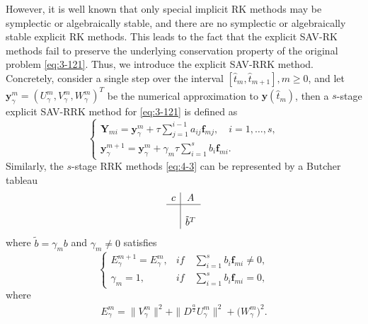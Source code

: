 \documentclass[preprint,compress,3p,10pt,fleqn]{elsarticle}
\numberwithin{equation}{section}
\begin{document}
However, it is well known that only special implicit RK methods may be symplectic or algebraically stable, and there are no symplectic or algebraically stable explicit RK methods. This leads to the fact that the explicit SAV-RK methods fail to preserve the underlying conservation property of the original problem \eqref{eq:3-121}. Thus, we introduce the explicit SAV-RRK method. Concretely, consider a single step over the interval $\left[\hat{t}_m, \hat{t}_{m+1}\right], m \geq 0$, and let $\bm{y}_\gamma^m=\left(U^{m}_{\gamma},V^{m}_{\gamma},W^{m}_{\gamma}\right)^T$ be the numerical approximation to $\bm{y}\left(\hat{t}_m\right)$,
then a $s$-stage explicit SAV-RRK method for \eqref{eq:3-121} is defined as
\begin{equation}
\left\{\begin{array}{l}
\bm{Y}_{m i}=\bm{y}_\gamma^m+\tau \sum\limits_{j=1}^{i-1} a_{i j} \bm{f}_{m j}, \quad i=1, \ldots, s, \\
\bm{y}_\gamma^{m+1}=\bm{y}_\gamma^m+\gamma_m \tau \sum\limits_{i=1}^s b_i \bm{f}_{m i}.
\end{array}\right.\label{eq:4-3}
\end{equation}
Similarly, the $s$-stage RRK methods \eqref{eq:4-3} can be represented by a Butcher tableau
\begin{equation}
\begin{array}{c|c}
c & A \\
\hline \\
& \tilde{b}^T
\end{array}
\end{equation}
where $\tilde{b}=\gamma_m b$ and $\gamma_m\neq 0$ satisfies
\begin{equation}
\left\{\begin{array}{ll}
E_{\gamma}^{m+1}=E_{\gamma}^{m}, & if \quad  \sum\limits_{i=1}^s b_i \bm{f}_{m i} \neq 0,\\
\gamma_m=1, & if \quad  \sum\limits_{i=1}^s b_i \bm{f}_{m i} =0,
\end{array}\right.\label{eq:4-6}
\end{equation}
where
\begin{align}\label{eq:4-6b}
E_{\gamma}^{m}  =\|V_{\gamma}^{m}\|^2+\|D^\frac{\alpha}{2} U_{\gamma}^{m}\|^2+\big(W_{\gamma}^{m}\big)^2.
\end{align}
\end{document}
